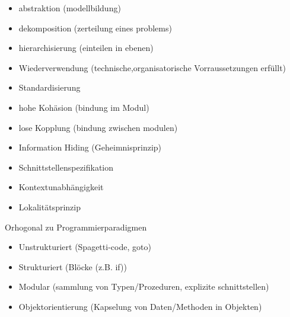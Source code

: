 \begin{itemize}
\item abstraktion (modellbildung)
\item dekomposition (zerteilung eines problems)
\item hierarchisierung (einteilen in ebenen)
\item Wiederverwendung (technische,organisatorische Vorraussetzungen erfüllt)
\item Standardisierung
\end{itemize}

\begin{itemize}
\item hohe Kohäsion (bindung im Modul)
\item lose Kopplung (bindung zwischen modulen)
\item Information Hiding (Geheimnisprinzip)
\item Schnittstellenspezifikation
\item Kontextunabhängigkeit
\item Lokalitätsprinzip
\end{itemize}

Orhogonal zu Programmierparadigmen
\begin{itemize}
\item Unstrukturiert (Spagetti-code, goto)
\item Strukturiert (Blöcke (z.B. if))
\item Modular (sammlung von Typen/Prozeduren, explizite schnittstellen)
\item Objektorientierung (Kapselung von Daten/Methoden in Objekten)
\end{itemize}
